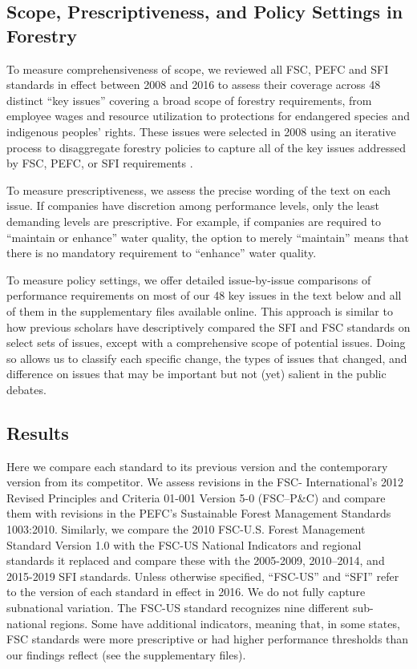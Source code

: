 \documentclass[
      12pt,
            Review ]{article}
\begin{document}
\hypertarget{scope-prescriptiveness-and-policy-settings-in-forestry}{%
\subsection{Scope, Prescriptiveness, and Policy Settings in Forestry}\label{scope-prescriptiveness-and-policy-settings-in-forestry}}

To measure comprehensiveness of scope, we reviewed all FSC, PEFC and SFI standards in effect between 2008 and 2016 to assess their coverage across 48 distinct ``key issues'' covering a broad scope of forestry requirements, from employee wages and resource utilization to protections for endangered species and indigenous peoples' rights. These issues were selected in 2008 using an iterative process to disaggregate forestry policies to capture all of the key issues addressed by FSC, PEFC, or SFI requirements \citep{McDermott2010}.

To measure prescriptiveness, we assess the precise wording of the text on each issue. If companies have discretion among performance levels, only the least demanding levels are prescriptive. For example, if companies are required to ``maintain or enhance'' water quality, the option to merely ``maintain'' means that there is no mandatory requirement to ``enhance'' water quality.

To measure policy settings, we offer detailed issue-by-issue comparisons of performance requirements on most of our 48 key issues in the text below and all of them in the supplementary files available online. This approach is similar to how previous scholars have descriptively compared the SFI and FSC standards on select sets of issues, except with a comprehensive scope of potential issues. Doing so allows us to classify each specific change, the types of issues that changed, and difference on issues that may be important but not (yet) salient in the public debates.

\hypertarget{results}{%
\subsection{Results}\label{results}}

Here we compare each standard to its previous version and the contemporary version from its competitor. We assess revisions in the FSC- International's 2012 Revised Principles and Criteria 01-001 Version 5-0 (FSC--P\&C) and compare them with revisions in the PEFC's Sustainable Forest Management Standards 1003:2010. Similarly, we compare the 2010 FSC-U.S. Forest Management Standard Version 1.0 with the FSC-US National Indicators and regional standards it replaced and compare these with the 2005-2009, 2010--2014, and 2015-2019 SFI standards. Unless otherwise specified, ``FSC-US'' and ``SFI'' refer to the version of each standard in effect in 2016. We do not fully capture subnational variation. The FSC-US standard recognizes nine different sub-national regions. Some have additional indicators, meaning that, in some states, FSC standards were more prescriptive or had higher performance thresholds than our findings reflect (see the supplementary files).
\end{document}
